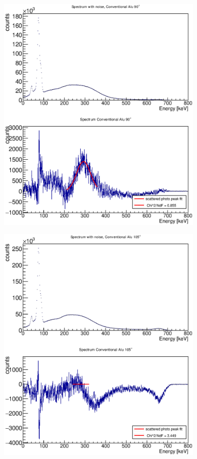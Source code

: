 \documentclass{article}
\begin{document}
\begin{figure}[H]
    \centering
    \includegraphics[width=0.9\textwidth]{Graphen/compton_spektren/90Alu.eps}
    \caption{}
\end{figure}
\begin{figure}[H]
    \centering
    \includegraphics[width=0.9\textwidth]{Graphen/compton_spektren/105Alu.eps}
    \caption{}
\end{figure}
\end{document}
